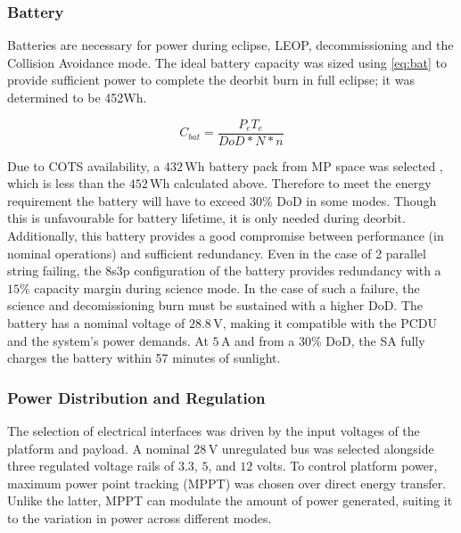 \documentclass[a4paper, 11pt, conference]{IEEEtran}
\begin{document}
\subsubsection{Battery}

Batteries are necessary for power during eclipse, LEOP, decommissioning and the Collision Avoidance mode. The ideal battery capacity was sized using \autoref{eq:bat} to provide sufficient power to complete the deorbit burn in full eclipse; it was determined to be 452Wh. 

\begin{equation}
C_{bat} = \frac{P_eT_e}{DoD*N*n}
\label{eq:bat}
\end{equation}

Due to COTS availability, a $432\,\mathrm{Wh}$ battery pack from MP space was selected \cite{MPSpacePack2_2024}, which is less than the $452\,\mathrm{Wh}$ calculated above. Therefore to meet the energy requirement the battery will have to exceed $30\%$ DoD in some modes. Though this is unfavourable for battery lifetime, it is only needed during deorbit. Additionally, this battery provides a good compromise between performance (in nominal operations) and sufficient redundancy. Even in the case of 2 parallel string failing, the 8s3p configuration of the battery provides redundancy with a $15\%$ capacity margin during science mode. In the case of such a failure, the science and decomissioning burn must be sustained with a higher DoD. The battery has a nominal voltage of $28.8\,\mathrm{V}$, making it compatible with the PCDU and the system's power demands. At $5\,\mathrm{A}$ and from a $30\%$ DoD, the SA fully charges the battery within 57 minutes of sunlight.

\subsubsection{Power Distribution and Regulation}

The selection of electrical interfaces was driven by the input voltages of the platform and payload. A nominal $28\,\mathrm{V}$ unregulated bus was selected alongside three regulated voltage rails of $3.3$, $5$, and $12$ volts. To control platform power, maximum power point tracking (MPPT) was chosen over direct energy transfer. Unlike the latter, MPPT can modulate the amount of power generated, suiting it to the variation in power across different modes.
\end{document}
